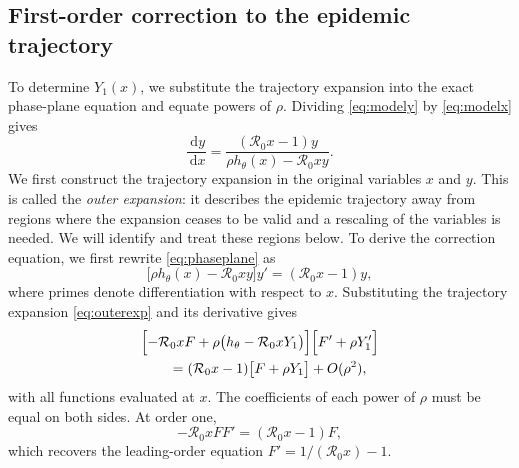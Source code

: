 \documentclass[11pt]{article}
\newcommand{\Rzero}{\mathcal R_0}
\newcommand{\rhoeps}{\rho}
\newcommand{\hth}{h_\theta}
\newcommand{\dd}{\,\mathrm d}
\begin{document}
\subsection{First-order correction to the epidemic trajectory}
To determine \(Y_1(x)\), we substitute the trajectory expansion into the exact phase-plane equation and equate powers of \(\rhoeps\). Dividing \cref{eq:modely} by \cref{eq:modelx} gives
\begin{equation}
\frac{\dd y}{\dd x}=
\frac{(\Rzero x-1)y}{\rhoeps\hth(x)-\Rzero xy}.
\label{eq:phaseplane}
\end{equation}
We first construct the trajectory expansion in the original variables \(x\) and \(y\). This is called the \emph{outer expansion}: it describes the epidemic trajectory away from regions where the expansion ceases to be valid and a rescaling of the variables is needed. We will identify and treat these regions below.
To derive the correction equation, we first rewrite \cref{eq:phaseplane} as
\[
\bigl[\rhoeps\hth(x)-\Rzero xy\bigr]y'=(\Rzero x-1)y,
\]
where primes denote differentiation with respect to \(x\). Substituting the trajectory expansion \cref{eq:outerexp} and its derivative gives
\[
\begin{aligned}
&\Bigl[-\Rzero xF+\rhoeps\bigl(\hth-\Rzero xY_1\bigr)\Bigr]
\Bigl[F'+\rhoeps Y_1'\Bigr]\\
&\qquad=(\Rzero x-1)\bigl[F+\rhoeps Y_1\bigr]+O(\rhoeps^2),
\end{aligned}
\]
with all functions evaluated at \(x\). The coefficients of each power of \(\rhoeps\) must be equal on both sides. At order one,
\[
-\Rzero xFF'=(\Rzero x-1)F,
\]
which recovers the leading-order equation \(F'=1/(\Rzero x)-1\).
\end{document}
